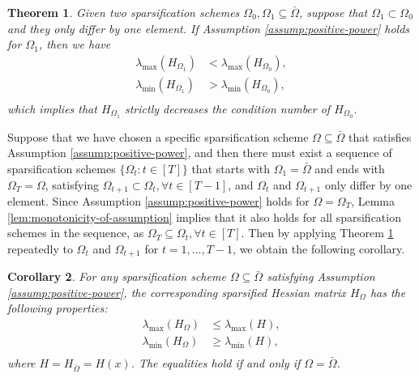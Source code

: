 \documentclass{article}
\theoremstyle{plain}
\newtheorem{theorem}{Theorem}[section]
\newtheorem{corollary}[theorem]{Corollary}
\theoremstyle{definition}
\theoremstyle{remark}
\begin{document}
\begin{theorem}
\label{thm:incremental-sparsification}
Given two sparsification schemes $\Omega_0, \Omega_1 \subseteq \bar{\Omega}$, suppose that $\Omega_1 \subset \Omega_0$ and they only differ by one element. If Assumption \ref{assump:positive-power} holds for $\Omega_1$, then we have
\begin{equation*}
 \begin{aligned}
    \lambda_{\max}(H_{\Omega_1}) &< \lambda_{\max}(H_{\Omega_0}), \\
    \lambda_{\min}(H_{\Omega_1}) &> \lambda_{\min}(H_{\Omega_0}), \\
\end{aligned}
\end{equation*}
which implies that $H_{\Omega_1}$ strictly decreases the condition number of $H_{\Omega_0}$.
\end{theorem}

Suppose that we have chosen a specific sparsification scheme $\Omega \subseteq \bar{\Omega}$ that satisfies Assumption \ref{assump:positive-power}, and then there must exist a sequence of sparsification schemes $\{\Omega_t : t \in [T]\}$ that starts with $\Omega_1 = \bar{\Omega}$ and ends with $\Omega_T = \Omega$, satisfying $\Omega_{t + 1} \subset \Omega_{t}, \forall t \in [T - 1]$, and $\Omega_t$ and $\Omega_{t+1}$ only differ by one element. Since Assumption \ref{assump:positive-power} holds for $\Omega = \Omega_T$,
Lemma \ref{lem:monotonicity-of-assumption} implies that it also holds for all sparsification schemes in the sequence,
as $\Omega_T \subseteq \Omega_t, \forall t \in [T]$. Then by applying Theorem \ref{thm:incremental-sparsification} repeatedly to $\Omega_{t}$ and $\Omega_{t+1}$ for $t=1,\ldots,T-1$, we obtain the following corollary.

\begin{corollary}
\label{cor:incremental-sparsification}
    For any sparsification scheme $\Omega \subseteq \bar{\Omega}$ satisfying Assumption \ref{assump:positive-power}, the corresponding sparsified Hessian matrix $H_{\Omega}$ has the following properties:
    \begin{equation*}
        \begin{aligned}
            \lambda_{\max}(H_{\Omega}) &\leq \lambda_{\max}(H), \\
            \lambda_{\min}(H_{\Omega}) &\geq \lambda_{\min}(H), \\
        \end{aligned}   
    \end{equation*}
    where $H = H_{\bar{\Omega}} = H(x)$. The equalities hold if and only if $\Omega = \bar{\Omega}$.
\end{corollary}
\end{document}
